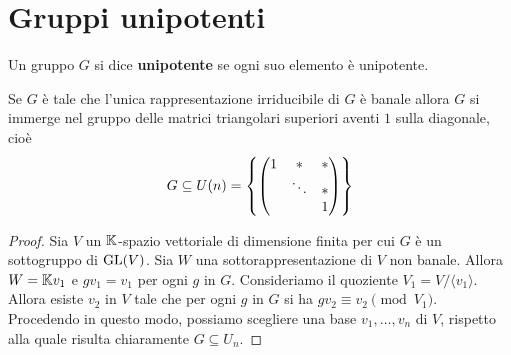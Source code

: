 \section{Gruppi unipotenti}
\begin{definition}
    Un gruppo $G$ si dice \textbf{unipotente} se ogni suo elemento è unipotente.
\end{definition}

\begin{lemma}\label{LmUnicaRappresentazioneIrriducibileBanaleImplicaUpperTriangularCon1SuDiagonale}
Se $G$ \`e tale che l'unica rappresentazione irriducibile di $G$ \`e banale allora $G$ si immerge nel gruppo delle matrici triangolari superiori aventi $1$ sulla diagonale, cio\`e
\[G\subseteq U(n)=\left\{{\begin{pmatrix}1 & \ast & \ast\\ &\ddots &\ast\\ &&1\end{pmatrix}}\right\}\]
\end{lemma}
\begin{proof}
    Sia $V$ un $\mathbb{K}$-spazio vettoriale di dimensione finita per cui $G$ è un sottogruppo di $\mathrm{GL}(V)$. Sia $W$ una sottorappresentazione di $V$ non banale. Allora $W=\mathbb{K} v_1$ e $g v_1=v_1$ per ogni $g$ in $G$. Consideriamo il quoziente $V_1=V/\langle v_1\rangle$. Allora esiste $v_2$ in $V$ tale che per ogni $g$ in $G$ si ha $gv_2\equiv v_2 \pmod{V_1}$. Procedendo in questo modo, possiamo scegliere una base $v_1,\ldots,v_n$ di $V$, rispetto alla quale risulta chiaramente $G\subseteq U_n$.
\end{proof}

